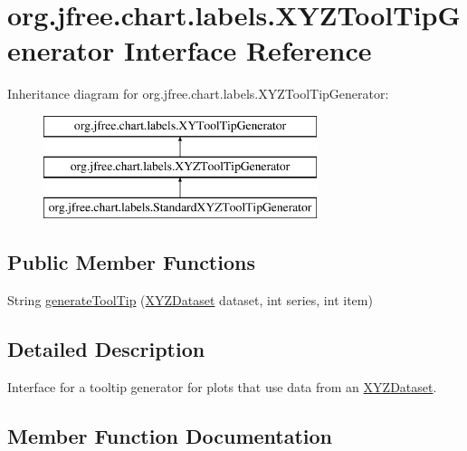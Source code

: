 \hypertarget{interfaceorg_1_1jfree_1_1chart_1_1labels_1_1_x_y_z_tool_tip_generator}{}\section{org.\+jfree.\+chart.\+labels.\+X\+Y\+Z\+Tool\+Tip\+Generator Interface Reference}
\label{interfaceorg_1_1jfree_1_1chart_1_1labels_1_1_x_y_z_tool_tip_generator}
Inheritance diagram for org.\+jfree.\+chart.\+labels.\+X\+Y\+Z\+Tool\+Tip\+Generator\+:\begin{figure}[H]
\begin{center}
\leavevmode
\includegraphics[height=3.000000cm]{interfaceorg_1_1jfree_1_1chart_1_1labels_1_1_x_y_z_tool_tip_generator}
\end{center}
\end{figure}
\subsection*{Public Member Functions}
\begin{DoxyCompactItemize}
\item 
String \mbox{\hyperlink{interfaceorg_1_1jfree_1_1chart_1_1labels_1_1_x_y_z_tool_tip_generator_a95beb3c983c58c59b2d7c87a55a7eaf6}{generate\+Tool\+Tip}} (\mbox{\hyperlink{interfaceorg_1_1jfree_1_1data_1_1xy_1_1_x_y_z_dataset}{X\+Y\+Z\+Dataset}} dataset, int series, int item)
\end{DoxyCompactItemize}


\subsection{Detailed Description}
Interface for a tooltip generator for plots that use data from an \mbox{\hyperlink{}{X\+Y\+Z\+Dataset}}. 

\subsection{Member Function Documentation}
\mbox{\label{interfaceorg_1_1jfree_1_1chart_1_1labels_1_1_x_y_z_tool_tip_generator_a95beb3c983c58c59b2d7c87a55a7eaf6}} 
